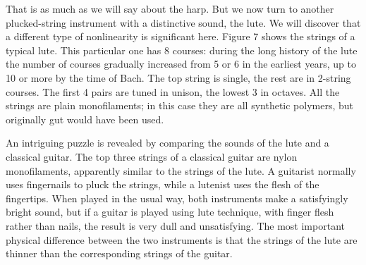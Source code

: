 





  That is as much as we will say about the harp. But we now turn to another 
  plucked-string instrument with a distinctive sound, the lute. We will 
  discover that a different type of nonlinearity is significant here. Figure 7 
  shows the strings of a typical lute. This particular one has 8 courses: 
  during the long history of the lute the number of courses gradually increased 
  from 5 or 6 in the earliest years, up to 10 or more by the time of Bach. The 
  top string is single, the rest are in 2-string courses. The first 4 pairs are 
  tuned in unison, the lowest 3 in octaves. All the strings are plain 
  monofilaments; in this case they are all synthetic polymers, but originally 
  gut would have been used. 


  An intriguing puzzle is revealed by comparing the sounds of the lute and a 
  classical guitar. The top three strings of a classical guitar are nylon 
  monofilaments, apparently similar to the strings of the lute. A guitarist 
  normally uses fingernails to pluck the strings, while a lutenist uses the 
  flesh of the fingertips. When played in the usual way, both instruments make 
  a satisfyingly bright sound, but if a guitar is played using lute technique, 
  with finger flesh rather than nails, the result is very dull and 
  unsatisfying. The most important physical difference between the two 
  instruments is that the strings of the lute are thinner than the 
  corresponding strings of the guitar. 

